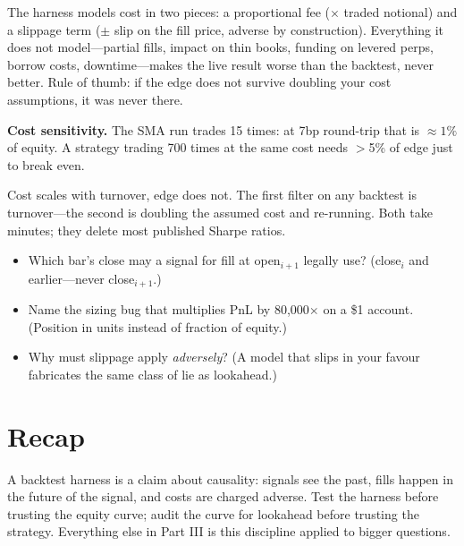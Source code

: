 The harness models cost in two pieces: a proportional fee ($\times$ traded notional) and a
slippage term ($\pm$ slip on the fill price, adverse by construction). Everything it does
not model---partial fills, impact on thin books, funding on levered perps, borrow costs,
downtime---makes the live result worse than the backtest, never better. Rule of thumb: if
the edge does not survive doubling your cost assumptions, it was never there.

\begin{example}\label{ex:costs}
\textbf{Cost sensitivity.} The SMA run trades 15 times: at 7bp round-trip that is
$\approx1\%$ of equity. A strategy trading 700 times at the same cost needs $>$5\% of edge
just to break even.
\begin{solution}
Cost scales with turnover, edge does not. The first filter on any backtest is
turnover---the second is doubling the assumed cost and re-running. Both take minutes;
they delete most published Sharpe ratios.
\end{solution}
\end{example}

\begin{checkpoint}
\begin{itemize}
\item Which bar's close may a signal for fill at open$_{i+1}$ legally use? (close$_i$ and
earlier---never close$_{i+1}$.)
\item Name the sizing bug that multiplies PnL by 80{,}000$\times$ on a \$1 account. (Position
in units instead of fraction of equity.)
\item Why must slippage apply \emph{adversely}? (A model that slips in your favour
fabricates the same class of lie as lookahead.)
\end{itemize}
\end{checkpoint}

\section{Recap}\label{sec:btrecap}

A backtest harness is a claim about causality: signals see the past, fills happen in the
future of the signal, and costs are charged adverse. Test the harness before trusting the
equity curve; audit the curve for lookahead before trusting the strategy. Everything else
in Part III is this discipline applied to bigger questions.

